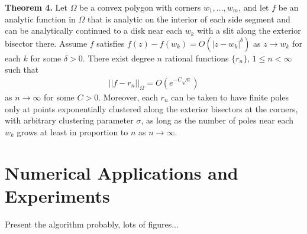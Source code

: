 \documentclass[12]{article}
\begin{document}
	\textbf{Theorem 4.} Let $\Omega$ be a convex polygon with corners $w_1 , \ldots , w_m$, and let $f$ be an analytic function in $\Omega$ that is analytic on the interior of each side segment and can be analytically continued to a disk near each $w_k$ with a slit along the exterior bisector there. Assume $f$ satisfies $f(z)-f(w_k)=O(|z-w_k|^\delta)$ as $z \to w_k$ for each $k$ for some $\delta >0$. There exist degree $n$ rational functions $\{r_n\},\, 1 \leq n < \infty$ such that
	\begin{align*}
||f-r_n||_\Omega=O(e^{-C\sqrt{n}})
	\end{align*}
as $n\to \infty$ for some $C>0$. Moreover, each $r_n$ can be taken to have finite poles only at points exponentially clustered along the exterior bisectors at the corners, with arbitrary clustering parameter $\sigma$, as long as the number of poles near each $w_k$ grows at least in proportion to $n$ as $n\to \infty$.

	
	\section{Numerical Applications and Experiments}
	
	Present the algorithm probably, lots of figures...



\pagebreak


\end{document}
